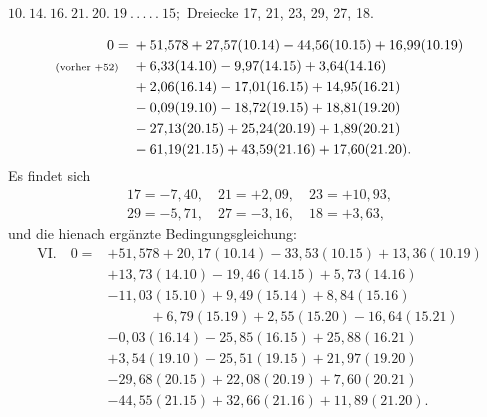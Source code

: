 \par\bigskip
\begin{center}
$10.\ 14.\ 16.\ 21.\ 20.\ 19\ .\,.\,.\,.\,.\ 15;$ Dreiecke 17, 21, 23, 29, 27, 18.
\end{center}
\[
\begin{aligned}
0={}&+51{,}578+27{,}57(10.14)-44{,}56(10.15)+16{,}99(10.19)\\
\text{\scriptsize(vorher $+52$)}\quad&+6{,}33(14.10)-9{,}97(14.15)+3{,}64(14.16)\\
&+2{,}06(16.14)-17{,}01(16.15)+14{,}95(16.21)\\
&-0{,}09(19.10)-18{,}72(19.15)+18{,}81(19.20)\\
&-27{,}13(20.15)+25{,}24(20.19)+1{,}89(20.21)\\
&-61{,}19(21.15)+43{,}59(21.16)+17{,}60(21.20).
\end{aligned}
\]
Es findet sich
\[
\begin{gathered}
17=-7{,}40,\quad21=+2{,}09,\quad23=+10{,}93,\\
29=-5{,}71,\quad27=-3{,}16,\quad18=+3{,}63,
\end{gathered}
\]
und die hienach ergänzte Bedingungsgleichung:
\[
\begin{aligned}
\mathrm{VI.}\quad0={}&+51{,}578+20{,}17(10.14)-33{,}53(10.15)+13{,}36(10.19)\\
&+13{,}73(14.10)-19{,}46(14.15)+5{,}73(14.16)\\
&-11{,}03(15.10)+9{,}49(15.14)+8{,}84(15.16)\\
&\qquad\quad+6{,}79(15.19)+2{,}55(15.20)-16{,}64(15.21)\\
&-0{,}03(16.14)-25{,}85(16.15)+25{,}88(16.21)\\
&+3{,}54(19.10)-25{,}51(19.15)+21{,}97(19.20)\\
&-29{,}68(20.15)+22{,}08(20.19)+7{,}60(20.21)\\
&-44{,}55(21.15)+32{,}66(21.16)+11{,}89(21.20).
\end{aligned}
\]
